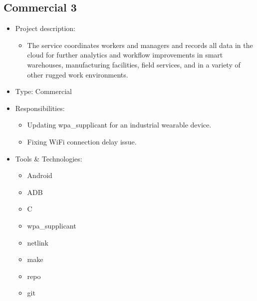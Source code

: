 \subsection{Commercial 3}
\begin{itemize}
    \item Project description:
    \begin{itemize}
        \item The service coordinates workers and managers and records all data in the
              cloud for further analytics and workflow improvements in smart warehouses,
              manufacturing facilities, field services, and in a variety of other rugged work
              environments.
    \end{itemize}
    \item Type: Commercial
    \item Responsibilities:
    \begin{itemize}
        \item Updating wpa\_supplicant for an industrial wearable device.
        \item Fixing WiFi connection delay issue.
    \end{itemize}
    \item Tools \& Technologies:
    \begin{itemize}
        \item Android
        \item ADB
        \item C
        \item wpa\_supplicant
        \item netlink
        \item make
        \item repo
        \item git
    \end{itemize}
\end{itemize}

